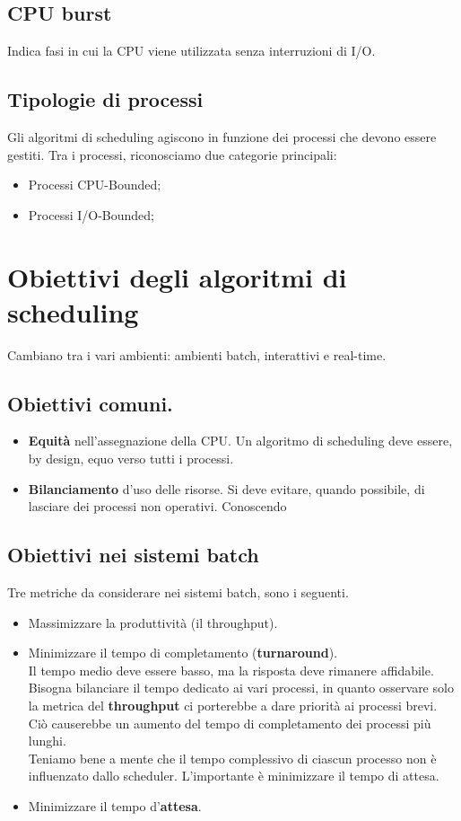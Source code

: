 \documentclass{report}
\begin{document}
\subsection{CPU burst}
Indica fasi in cui la CPU viene utilizzata senza interruzioni di I/O.

\subsection{Tipologie di processi}
Gli algoritmi di scheduling agiscono in funzione dei processi che devono essere gestiti. Tra i processi, riconosciamo due categorie principali:
\begin{itemize}
    \item Processi CPU-Bounded;
    \item Processi I/O-Bounded;
\end{itemize}


\section{Obiettivi degli algoritmi di scheduling}
Cambiano tra i vari ambienti: ambienti batch, interattivi e real-time.

\subsection{Obiettivi comuni.}
\begin{itemize}
    \item \textbf{Equità} nell'assegnazione della CPU. Un algoritmo di scheduling deve essere, by design, equo verso tutti i processi.
    \item \textbf{Bilanciamento} d'uso delle risorse. Si deve evitare, quando possibile, di lasciare dei processi non operativi. Conoscendo 
\end{itemize}

\subsection{Obiettivi nei sistemi batch}
Tre metriche da considerare nei sistemi batch, sono i seguenti.
\begin{itemize}
    \item Massimizzare la produttività (il throughput).
    \item Minimizzare il tempo di completamento (\textbf{turnaround}).\\
        Il tempo medio deve essere basso, ma la risposta deve rimanere affidabile. Bisogna bilanciare il tempo dedicato ai vari processi, in quanto osservare solo la metrica del \textbf{throughput} ci porterebbe a dare priorità ai processi brevi. Ciò causerebbe un aumento del tempo di completamento dei processi più lunghi.\\
        Teniamo bene a mente che il tempo complessivo di ciascun processo non è influenzato dallo scheduler. L'importante è minimizzare il tempo di attesa.

    \item Minimizzare il tempo d'\textbf{attesa}.
\end{itemize}
\end{document}

